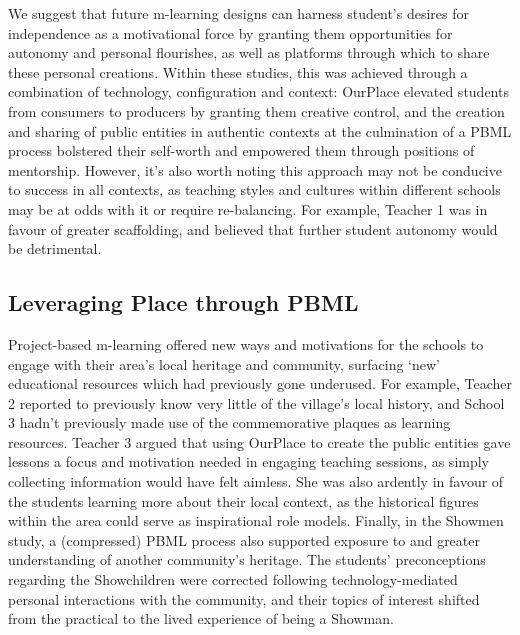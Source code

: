 \documentclass[,hyphens]{sigchi}
\begin{document}
We suggest that future m-learning designs can harness student's desires for independence as a motivational force by granting them opportunities for autonomy and personal flourishes, as well as platforms through which to share these personal creations. Within these studies, this was achieved through a combination of technology, configuration and context: OurPlace elevated students from consumers to producers by granting them creative control, and the creation and sharing of public entities in authentic contexts at the culmination of a PBML process bolstered their self-worth and empowered them through positions of mentorship. However, it's also worth noting this approach may not be conducive to success in all contexts, as teaching styles and cultures within different schools may be at odds with it or require re-balancing. For example, Teacher 1 was in favour of greater scaffolding, and believed that further student autonomy would be detrimental. 

\subsection{Leveraging Place through PBML}
Project-based m-learning offered new ways and motivations for the schools to engage with their area's local heritage and community, surfacing `new' educational resources which had previously gone underused. For example, Teacher 2 reported to previously know very little of the village's local history, and School 3 hadn't previously made use of the commemorative plaques as learning resources. Teacher 3 argued that using OurPlace to create the public entities gave lessons a focus and motivation needed in engaging teaching sessions, as simply collecting information would have felt aimless. She was also ardently in favour of the students learning more about their local context, as the historical figures within the area could serve as inspirational role models. Finally, in the Showmen study, a (compressed) PBML process also supported exposure to and greater understanding of another community's heritage. The students' preconceptions regarding the Showchildren were corrected following technology-mediated personal interactions with the community, and their topics of interest shifted from the practical to the lived experience of being a Showman.
\end{document}
